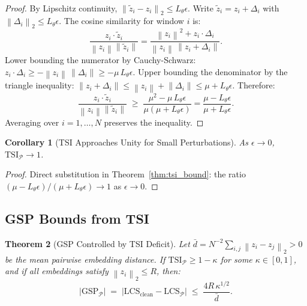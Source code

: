 \documentclass[12pt]{article}
\newtheorem{theorem}{Theorem}[section]
\newtheorem{corollary}[theorem]{Corollary}
\theoremstyle{definition}
\theoremstyle{remark}
\newcommand{\Pset}{\mathcal{P}}
\newcommand{\norm}[1]{\left\lVert #1 \right\rVert}
\newcommand{\abs}[1]{\left| #1 \right|}
\newcommand{\lcs}{\mathrm{LCS}}
\newcommand{\tsi}{\mathrm{TSI}}
\newcommand{\gsp}{\mathrm{GSP}}
\begin{document}
\begin{proof}
By Lipschitz continuity, $\norm{\tilde{z}_i - z_i}_2 \leq L_\theta\epsilon$.
Write $\tilde{z}_i = z_i + \Delta_i$ with $\norm{\Delta_i}_2 \leq L_\theta\epsilon$.
The cosine similarity for window $i$ is:
\[
  \frac{z_i \cdot \tilde{z}_i}{\norm{z_i}\norm{\tilde{z}_i}}
  = \frac{\norm{z_i}^2 + z_i \cdot \Delta_i}{\norm{z_i}\,\norm{z_i + \Delta_i}}.
\]
Lower bounding the numerator by Cauchy-Schwarz:
$z_i \cdot \Delta_i \geq -\norm{z_i}\,\norm{\Delta_i} \geq -\mu\,L_\theta\epsilon$.
Upper bounding the denominator by the triangle inequality:
$\norm{z_i + \Delta_i} \leq \norm{z_i} + \norm{\Delta_i} \leq \mu + L_\theta\epsilon$.
Therefore:
\[
  \frac{z_i \cdot \tilde{z}_i}{\norm{z_i}\norm{\tilde{z}_i}}
  \;\geq\; \frac{\mu^2 - \mu\,L_\theta\epsilon}{\mu(\mu + L_\theta\epsilon)}
  = \frac{\mu - L_\theta\epsilon}{\mu + L_\theta\epsilon}.
\]
Averaging over $i = 1, \ldots, N$ preserves the inequality.
\end{proof}

\begin{corollary}[TSI Approaches Unity for Small Perturbations]
\label{cor:tsi_limit}
As $\epsilon \to 0$, $\tsi_\Pset \to 1$.
\end{corollary}

\begin{proof}
Direct substitution in Theorem~\ref{thm:tsi_bound}: the ratio
$(\mu - L_\theta\epsilon)/(\mu + L_\theta\epsilon) \to 1$ as $\epsilon \to 0$.
\end{proof}

\subsection{GSP Bounds from TSI}

\begin{theorem}[GSP Controlled by TSI Deficit]
\label{thm:gsp_bound}
Let $\bar{d} = N^{-2}\sum_{i,j}\norm{z_i - z_j}_2 > 0$ be the mean pairwise
embedding distance. If $\tsi_\Pset \geq 1 - \kappa$ for some
$\kappa \in [0,1]$, and if all embeddings satisfy $\norm{z_i}_2 \leq R$, then:
\[
  \abs{\gsp_\Pset} \;=\; \abs{\lcs_{\mathrm{clean}} - \lcs_\Pset}
  \;\leq\; \frac{4R\,\kappa^{1/2}}{\bar{d}}.
\]
\end{theorem}
\end{document}

